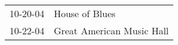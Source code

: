 \begin{supertabular}{p{0.07\textwidth}p{0.23\textwidth}}
 10-20-04 &             House of Blues \\
 10-22-04 &  Great American Music Hall \\
\end{supertabular}
